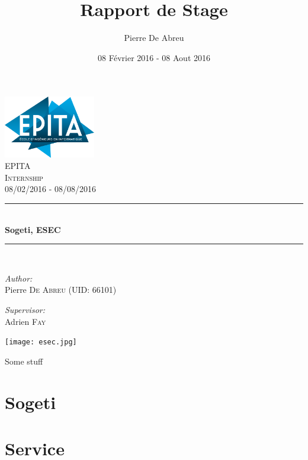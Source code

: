 \documentclass[a4paper, 12pt]{report}
\title{Rapport de Stage}
\author{Pierre De Abreu}
\date{08 Février 2016 - 08 Aout 2016}
\newcommand{\HRule}{\rule{\linewidth}{0.5mm}}
\begin{document}
\begin{titlepage}
\begin{center}

\includegraphics[width=0.3\textwidth]{epita.png}~\\[1cm]

\textsc{\LARGE EPITA}\\[1.5cm]

\textsc{\Large  Internship}\\[0.5cm]
\textsc{\Large 08/02/2016 - 08/08/2016}

\HRule \\[0.4cm]
{ \huge \bfseries Sogeti, ESEC \\[0.4cm] }

\HRule \\[1.5cm]

\begin{minipage}{0.4\textwidth}
\begin{flushleft} \large
\emph{Author:}\\
Pierre \textsc{De Abreu (UID: 66101)}
\end{flushleft}
\end{minipage}
\begin{minipage}{0.4\textwidth}
\begin{flushright} \large
\emph{Supervisor:} \\
Adrien \textsc{Fay}
\end{flushright}
\end{minipage}

\texttt{[image: esec.jpg]}~\\[1cm]

\vfill

{\large Some stuff}
\end{center}
\end{titlepage}
\section*{Sogeti}
\section*{Service}
\end{document}
